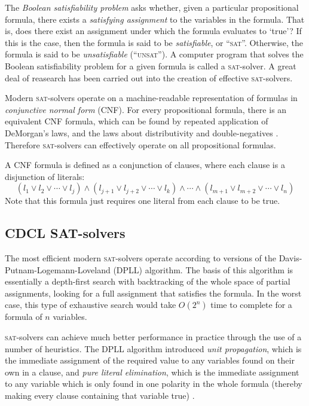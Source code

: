 \documentclass[proof,pdftex,11pt,a4,titlepage]{article}
\newcommand{\sat}{\textsc{sat}}
\newcommand{\unsat}{\textsc{unsat}}
\begin{document}
The \emph{Boolean satisfiability problem} asks whether, given a particular propositional formula, there exists a \emph{satisfying assignment} to the variables in the formula. That is, does there exist an assignment under which the formula evaluates to `true'? If this is the case, then the formula is said to be \emph{satisfiable}, or ``\sat{}''. Otherwise, the formula is said to be \emph{unsatisfiable} (``\unsat{}''). A computer program that solves the Boolean satisfiability problem for a given formula is called a \sat{}-solver. A great deal of reasearch has been carried out into the creation of effective \sat{}-solvers.

Modern \sat{}-solvers operate on a machine-readable representation of formulas in \emph{conjunctive normal form} (CNF). For every propositional formula, there is an equivalent CNF formula, which can be found by repeated application of DeMorgan's laws, and the laws about distributivity and double-negatives \cite{Plaisted:1986}. Therefore \sat{}-solvers can effectively operate on all propositional formulas.

A CNF formula is defined as a conjunction of clauses, where each clause is a disjunction of literals:
\[(l_1 \vee l_2 \vee \cdots \vee l_j) \wedge (l_{j+1} \vee l_{j+2} \vee \cdots \vee l_k) \wedge \cdots \wedge (l_{m+1} \vee l_{m+2} \vee \cdots \vee l_n)\]
Note that this formula just requires one literal from each clause to be true.

\subsection{CDCL SAT-solvers}

The most efficient modern \sat{}-solvers operate according to versions of the Davis-Putnam-Logemann-Loveland (DPLL) algorithm. The basis of this algorithm is essentially a depth-first search with backtracking of the whole space of partial assignments, looking for a full assignment that satisfies the formula. In the worst case, this type of exhaustive search would take $O(2^n)$ time to complete for a formula of $n$ variables.

\sat{}-solvers can achieve much better performance in practice through the use of a number of heuristics. The DPLL algorithm introduced \emph{unit propagation}, which is the immediate assignment of the required value to any variables found on their own in a clause, and \emph{pure literal elimination}, which is the immediate assignment to any variable which is only found in one polarity in the whole formula (thereby making every clause containing that variable true) \cite{Davis:1962}.
\end{document}
